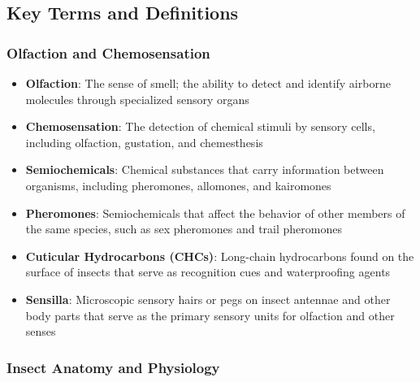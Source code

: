\documentclass[
  13pt,
  a4paperpaper,
  12pt]{article}
\providecommand{\tightlist}{%
  \setlength{\itemsep}{0pt}\setlength{\parskip}{0pt}}
\begin{document}
\subsection{Key Terms and Definitions}\label{key-terms-and-definitions}

\subsubsection{Olfaction and
Chemosensation}\label{olfaction-and-chemosensation}

\begin{itemize}
\tightlist
\item
  \textbf{Olfaction}: The sense of smell; the ability to detect and
  identify airborne molecules through specialized sensory organs
\item
  \textbf{Chemosensation}: The detection of chemical stimuli by sensory
  cells, including olfaction, gustation, and chemesthesis
\item
  \textbf{Semiochemicals}: Chemical substances that carry information
  between organisms, including pheromones, allomones, and kairomones
\item
  \textbf{Pheromones}: Semiochemicals that affect the behavior of other
  members of the same species, such as sex pheromones and trail
  pheromones
\item
  \textbf{Cuticular Hydrocarbons (CHCs)}: Long-chain hydrocarbons found
  on the surface of insects that serve as recognition cues and
  waterproofing agents
\item
  \textbf{Sensilla}: Microscopic sensory hairs or pegs on insect
  antennae and other body parts that serve as the primary sensory units
  for olfaction and other senses
\end{itemize}

\subsubsection{Insect Anatomy and
Physiology}\label{insect-anatomy-and-physiology}
\end{document}
